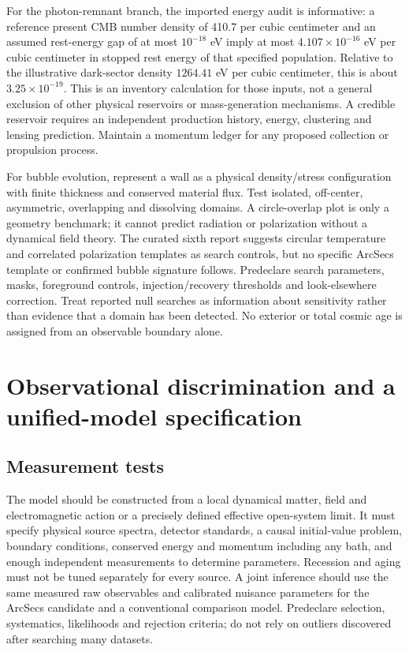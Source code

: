 \documentclass[
  11pt,
  twoside]{article}
\begin{document}
For the photon-remnant branch, the imported energy audit is informative:
a reference present CMB number density of 410.7 per cubic centimeter and
an assumed rest-energy gap of at most \(10^{-18}\) eV imply at most
\(4.107\times10^{-16}\) eV per cubic centimeter in stopped rest energy
of that specified population. Relative to the illustrative dark-sector
density \(1264.41\) eV per cubic centimeter, this is about
\(3.25\times10^{-19}\). This is an inventory calculation for those
inputs, not a general exclusion of other physical reservoirs or
mass-generation mechanisms. A credible reservoir requires an independent
production history, energy, clustering and lensing prediction. Maintain
a momentum ledger for any proposed collection or propulsion process.

For bubble evolution, represent a wall as a physical density/stress
configuration with finite thickness and conserved material flux. Test
isolated, off-center, asymmetric, overlapping and dissolving domains. A
circle-overlap plot is only a geometry benchmark; it cannot predict
radiation or polarization without a dynamical field theory. The curated
sixth report suggests circular temperature and correlated polarization
templates as search controls, but no specific ArcSecs template or
confirmed bubble signature follows. Predeclare search parameters, masks,
foreground controls, injection/recovery thresholds and look-elsewhere
correction. Treat reported null searches as information about
sensitivity rather than evidence that a domain has been detected. No
exterior or total cosmic age is assigned from an observable boundary
alone.

\section{Observational discrimination and a unified-model
specification}\label{observational-discrimination-and-a-unified-model-specification}

\subsection{Measurement tests}\label{measurement-tests}

The model should be constructed from a local dynamical matter, field and
electromagnetic action or a precisely defined effective open-system
limit. It must specify physical source spectra, detector standards, a
causal initial-value problem, boundary conditions, conserved energy and
momentum including any bath, and enough independent measurements to
determine parameters. Recession and aging must not be tuned separately
for every source. A joint inference should use the same measured raw
observables and calibrated nuisance parameters for the ArcSecs candidate
and a conventional comparison model. Predeclare selection, systematics,
likelihoods and rejection criteria; do not rely on outliers discovered
after searching many datasets.
\end{document}
